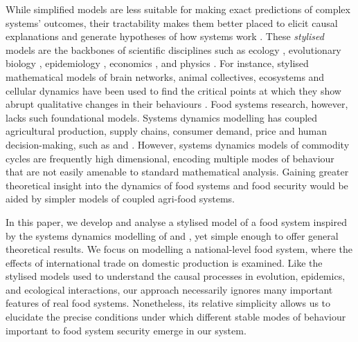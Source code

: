 \documentclass[9pt,twocolumn,twoside,lineno]{pnas-new}
\begin{document}
While simplified models are less suitable for making exact predictions of complex systems' outcomes, their tractability makes them better placed to elicit causal explanations and generate hypotheses of how systems work \cite{smaldino2017,smaldino2019,otto2020}. These \textit{stylised} models are the backbones of scientific disciplines such as ecology \cite{may1973}, evolutionary biology \cite{boyd2003}, epidemiology \cite{kermack1927}, economics \cite{nerlove1958}, and physics \cite{strogatz1994}. For instance, stylised mathematical models of brain networks, animal collectives, ecosystems and cellular dynamics have been used to find the critical points at which they show abrupt qualitative changes in their behaviours \cite{sole1996,scheffer2001}. Food systems research, however, lacks such foundational models. Systems dynamics modelling has coupled agricultural production, supply chains, consumer demand, price and human decision-making, such as \cite{meadows1971} and \cite{sterman2000}. However, systems dynamics models of commodity cycles are frequently high dimensional, encoding multiple modes of behaviour that are not easily amenable to standard mathematical analysis. Gaining greater theoretical insight into the dynamics of food systems and food security would be aided by simpler models of coupled agri-food systems.

In this paper, we develop and analyse a stylised model of a food system inspired by the systems dynamics modelling of \cite{meadows1971} and \cite{sterman2000}, yet simple enough to offer general theoretical results. We focus on modelling a national-level food system, where the effects of international trade on domestic production is examined. Like the stylised models used to understand the causal processes in evolution, epidemics, and ecological interactions, our approach necessarily ignores many important features of real food systems. Nonetheless, its relative simplicity allows us to elucidate the precise conditions under which different stable modes of behaviour important to food system security emerge in our system.
\end{document}
